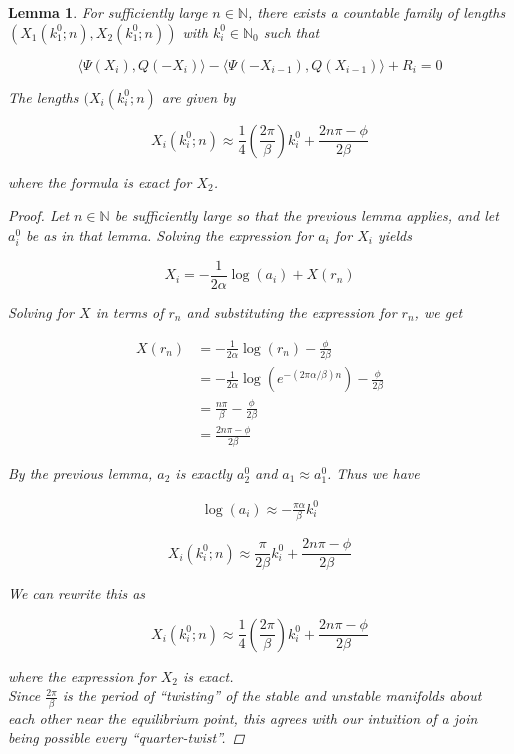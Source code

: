 \documentclass[12pt]{article}
\def\N{{\mathbb N}}
\newtheorem{lemma}{Lemma}
\begin{document}
\begin{lemma}
For sufficiently large $n \in \N$, there exists a countable family of lengths $(X_1(k_1^0; n), X_2(k_1^0; n))$ with $k_i^0 \in \N_0$ such that

\[
\langle \Psi(X_i), Q(-X_i) \rangle - \langle \Psi(-X_{i-1}), Q(X_{i-1}) \rangle + R_i = 0
\]

The lengths $(X_i(k_i^0; n)$ are given by

\begin{equation}
X_i(k_i^0; n) \approx \frac{1}{4} \left( \frac{2 \pi}{\beta} \right) k_i^0 + \frac{2 n \pi - \phi}{2 \beta}
\end{equation}

where the formula is exact for $X_2$.

\begin{proof}
Let $n \in \N$ be sufficiently large so that the previous lemma applies, and let $a_i^0$ be as in that lemma. Solving the expression for $a_i$ for $X_i$ yields

\[
X_i = -\frac{1}{2 \alpha}\log(a_i) + X(r_n)
\]

Solving for $X$ in terms of $r_n$ and substituting the expression for $r_n$, we get

\begin{align*}
X(r_n) &= -\frac{1}{2 \alpha}\log\left( r_n \right) - \frac{\phi}{2 \beta} \\
&= -\frac{1}{2 \alpha}\log\left( e^{-(2 \pi \alpha / \beta) n} \right) - \frac{\phi}{2 \beta} \\
&= \frac{n \pi}{\beta} - \frac{\phi}{2 \beta} \\
&= \frac{2 n \pi - \phi}{2 \beta} 
\end{align*}

By the previous lemma, $a_2$ is exactly $a_2^0$ and $a_1 \approx a_1^0$. Thus we have 

\begin{align*}
\log( a_i ) \approx -\frac{\pi \alpha}{\beta} k_i^0
\end{align*}

\[
X_i(k_i^0; n) \approx \frac{\pi}{2 \beta} k_i^0 + \frac{2 n \pi - \phi}{2 \beta} 
\]

We can rewrite this as

\[
X_i(k_i^0; n) \approx \frac{1}{4} \left( \frac{2 \pi}{\beta} \right) k_i^0 + \frac{2 n \pi - \phi}{2 \beta}
\]

where the expression for $X_2$ is exact.\\

Since $\frac{2 \pi}{\beta}$ is the period of ``twisting'' of the stable and unstable manifolds about each other near the equilibrium point, this agrees with our intuition of a join being possible every ``quarter-twist''.

\end{proof}
\end{lemma}
\end{document}
